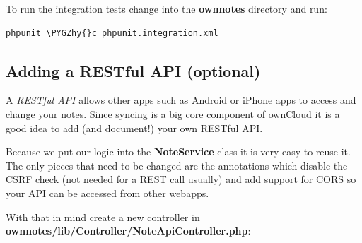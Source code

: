 \documentclass[letterpaper,10pt,english]{sphinxmanual}
\def\PYGZhy{\char`\-}
\begin{document}
To run the integration tests change into the \textbf{ownnotes} directory and run:

\begin{Verbatim}[commandchars=\\\{\}]
phpunit \PYGZhy{}c phpunit.integration.xml
\end{Verbatim}


\subsection{Adding a RESTful API (optional)}
\label{app/tutorial:adding-a-restful-api-optional}
A {\hyperref[app/api::doc]{\emph{RESTful API}}} allows other apps such as Android or iPhone apps to access and change your notes. Since syncing is a big core component of ownCloud it is a good idea to add (and document!) your own RESTful API.

Because we put our logic into the \textbf{NoteService} class it is very easy to reuse it. The only pieces that need to be changed are the annotations which disable the CSRF check (not needed for a REST call usually) and add support for \href{https://developer.mozilla.org/en-US/docs/Web/HTTP/Access\_control\_CORS}{CORS} so your API can be accessed from other webapps.

With that in mind create a new controller in \textbf{ownnotes/lib/Controller/NoteApiController.php}:
\end{document}
